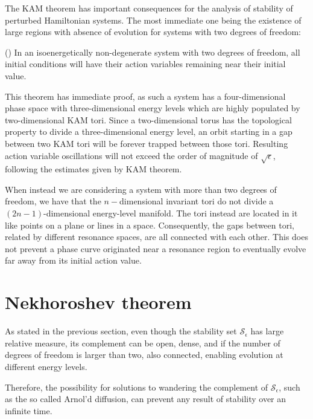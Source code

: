 The KAM theorem has important consequences for the analysis of stability of perturbed Hamiltonian systems. The most immediate one being the existence of large regions with absence of evolution for systems with two degrees of freedom:
\begin{theorem}(\cite{KAM1})
    In an isoenergetically non-degenerate system with two degrees of freedom, all initial conditions will have their action variables remaining near their initial value.
\end{theorem} 
This theorem has immediate proof, as such a system has a four-dimensional phase space with three-dimensional energy levels which are highly populated by two-dimensional KAM tori. Since a two-dimensional torus has the topological property to divide a three-dimensional energy level, an orbit starting in a gap between two KAM tori will be forever trapped between those tori. Resulting action variable oscillations will not exceed the order of magnitude of $\sqrt{\epsilon}$, following the estimates given by KAM theorem. 

When instead we are considering a system with more than two degrees of freedom, we have that the $n-$dimensional invariant tori do not divide a $(2n-1)$-dimensional energy-level manifold. The tori instead are located in it like points on a plane or lines in a space. Consequently, the gaps between tori, related by different resonance spaces, are all connected with each other. This does not prevent a phase curve originated near a resonance region to eventually evolve far away from its initial action value. 

\section{Nekhoroshev theorem}\label{sec:1:nekhoroshev}

As stated in the previous section, even though the stability set $\mathcal{S}_\epsilon$ has large relative measure, its complement can be open, dense, and if the number of degrees of freedom is larger than two, also connected, enabling evolution at different energy levels.

Therefore, the possibility for solutions to wandering the complement of $\mathcal{S}_\epsilon$, such as the so called Arnol’d diffusion, can prevent any result of stability over an infinite time.

